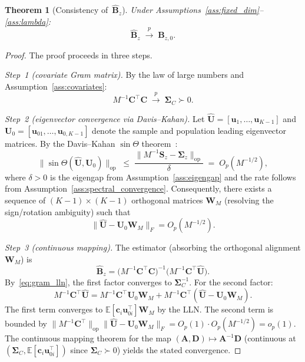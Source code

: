 \documentclass{article}
\newtheorem{theorem}{Theorem}
\begin{document}
\begin{theorem}[Consistency of~$\hat{\mathbf{B}}_z$]
\label{thm:consistency}
Under
Assumptions~\ref{ass:fixed_dim}--\ref{ass:lambda}:
\[
  \hat{\mathbf{B}}_z
  \;\xrightarrow{p}\;
  \mathbf{B}_{z,0}.
\]
\end{theorem}

\begin{proof}
The proof proceeds in three steps.

\emph{Step~1 (covariate Gram matrix).}
By the law of large numbers and
Assumption~\ref{ass:covariates}:
\begin{equation}
  M^{-1}\mathbf{C}^{\!\top}\mathbf{C}
  \;\xrightarrow{p}\;
  \boldsymbol{\Sigma}_C \succ 0.
  \label{eq:gram_lln}
\end{equation}

\emph{Step~2 (eigenvector convergence via Davis--Kahan).}
Let $\hat{\mathbf{U}} = [\mathbf{u}_1,\dots,\mathbf{u}_{K-1}]$ and
$\mathbf{U}_0 = [\mathbf{u}_{01},\dots,\mathbf{u}_{0,K-1}]$ denote the
sample and population leading eigenvector matrices.
By the Davis--Kahan $\sin\Theta$
theorem~\citep{davis1970rotation}:
\begin{equation}
  \bigl\|
    \sin\Theta(\hat{\mathbf{U}},\mathbf{U}_0)
  \bigr\|_{\mathrm{op}}
  \;\leq\;
  \frac{\|M^{-1}\mathbf{S}_z - \boldsymbol{\Sigma}_z\|_{\mathrm{op}}}
       {\delta}
  \;=\;
  O_p(M^{-1/2}),
  \label{eq:davis_kahan}
\end{equation}
where $\delta>0$ is the eigengap from
Assumption~\ref{ass:eigengap} and the rate follows from
Assumption~\ref{ass:spectral_convergence}.
Consequently, there exists a sequence of $(K{-}1)\times(K{-}1)$
orthogonal matrices $\mathbf{W}_M$ (resolving the sign/rotation
ambiguity) such that
\begin{equation}
  \bigl\|\hat{\mathbf{U}} - \mathbf{U}_0\mathbf{W}_M\bigr\|_F
  = O_p(M^{-1/2}).
  \label{eq:eigvec_convergence}
\end{equation}

\emph{Step~3 (continuous mapping).}
The estimator (absorbing the orthogonal alignment $\mathbf{W}_M$) is
\[
  \hat{\mathbf{B}}_z
  = \bigl(M^{-1}\mathbf{C}^{\!\top}\mathbf{C}\bigr)^{-1}
    \bigl(M^{-1}\mathbf{C}^{\!\top}\hat{\mathbf{U}}\bigr).
\]
By~\eqref{eq:gram_lln}, the first factor converges to
$\boldsymbol{\Sigma}_C^{-1}$.
For the second factor:
\[
  M^{-1}\mathbf{C}^{\!\top}\hat{\mathbf{U}}
  = M^{-1}\mathbf{C}^{\!\top}\mathbf{U}_0\mathbf{W}_M
    + M^{-1}\mathbf{C}^{\!\top}
      (\hat{\mathbf{U}}-\mathbf{U}_0\mathbf{W}_M).
\]
The first term converges to
$\mathbb{E}[\mathbf{c}_i\mathbf{u}_{0i}^{\!\top}]\mathbf{W}_M$ by
the LLN. The second term is bounded by
$\|M^{-1}\mathbf{C}^{\!\top}\|_{\mathrm{op}}
 \|\hat{\mathbf{U}}-\mathbf{U}_0\mathbf{W}_M\|_F
 = O_p(1)\cdot O_p(M^{-1/2}) = o_p(1)$.
The continuous mapping theorem for the map
$(\mathbf{A},\mathbf{D})\mapsto\mathbf{A}^{-1}\mathbf{D}$ (continuous
at $(\boldsymbol{\Sigma}_C, \mathbb{E}[\mathbf{c}_i\mathbf{u}_{0i}^{\!\top}])$
since $\boldsymbol{\Sigma}_C\succ 0$) yields the stated convergence.
\end{proof}
\end{document}
